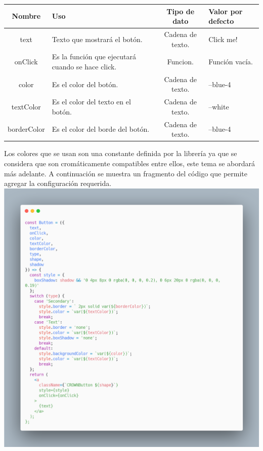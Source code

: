 \begin{center}
 \begin{tabular}{ | c |  p{5cm}  | c | p{3cm} |} 
 \hline
 \textbf{Nombre} &  \textbf{Uso} &  \textbf{ Tipo de dato} &  \textbf{Valor por defecto}\\ [0.5ex] 
 \hline\hline
text & Texto que mostrará el botón.  &  Cadena de texto. & Click me! \\  [2.5ex] 
 \hline
onClick & Es la función que ejecutará cuando se hace click. & Funcion. & Función vacía. \\[2.5ex] 
 \hline
color &  Es el color del botón. & Cadena de texto. & --blue-4 \\[3.5ex] 
 \hline
 textColor & Es el color del texto en el botón. &  Cadena de texto. & --white \\[2.5ex] 
 \hline
borderColor & Es el color del borde del botón. & Cadena de texto. & --blue-4 \\ [2.5ex] 
 \hline
\end{tabular}
\end{center}
\newline
\newline
Los colores que se usan son una constante definida por la librería ya que se considera que son cromáticamente compatibles entre ellos, este tema se abordará más adelante.
A continuación se muestra un fragmento del código que permite agregar la configuración requerida.
\newline
\newline
\includegraphics[width=1\textwidth]{./Imagenes/carbon-9.png}
